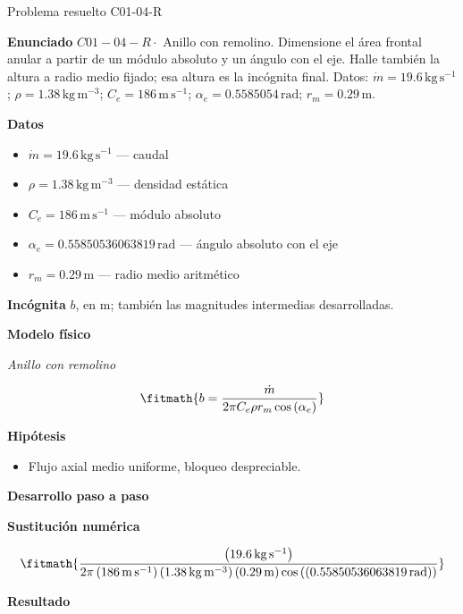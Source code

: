 \documentclass[10pt,openany]{book}
\begin{document}
\begin{studiumworked}{Problema resuelto C01-04-R}


\noindent\textbf{Enunciado}
\(C01-04-R \cdot\) Anillo con remolino. Dimensione el área frontal anular a partir de un módulo absoluto y un ángulo con el eje. Halle también la altura a radio medio fijado; esa altura es la incógnita final. Datos: \(\dot m=19.6\, \mathrm{kg}\,\mathrm{s}^{-1}\); \(\rho=1.38\, \mathrm{kg}\,\mathrm{m}^{-3}\); \(C_e=186\, \mathrm{m}\,\mathrm{s}^{-1}\); \(\alpha_e=0.5585054\, \mathrm{rad}\); \(r_m=0.29\, \mathrm{m}\).

\noindent\textbf{Datos}
\begin{itemize}
\item $\dot m = 19.6\,\mathrm{kg}\,\mathrm{s}^{-1}$ — caudal
\item $\rho = 1.38\,\mathrm{kg}\,\mathrm{m}^{-3}$ — densidad estática
\item $C_e = 186\,\mathrm{m}\,\mathrm{s}^{-1}$ — módulo absoluto
\item $\alpha_e = 0.55850536063819\,\mathrm{rad}$ — ángulo absoluto con el eje
\item $r_m = 0.29\,\mathrm{m}$ — radio medio aritmético
\end{itemize}

\noindent\textbf{Incógnita}
$b$, en $\mathrm{m}$; también las magnitudes intermedias desarrolladas.

\noindent\textbf{Modelo físico}

\noindent\textit{Anillo con remolino}

\[
\fitmath{b=\frac{\dot m}{2 \pi C_e \rho r_m \cos{\left(\alpha_e \right)}}}
\]

\noindent\textbf{Hipótesis}
\begin{itemize}
\item Flujo axial medio uniforme, bloqueo despreciable.
\end{itemize}

\noindent\textbf{Desarrollo paso a paso}



\noindent\textbf{Sustitución numérica}

\[
\fitmath{\frac{\left(19.6\,\mathrm{kg}\,\mathrm{s}^{-1}\right)}{2 \pi \left(186\,\mathrm{m}\,\mathrm{s}^{-1}\right) \left(1.38\,\mathrm{kg}\,\mathrm{m}^{-3}\right) \left(0.29\,\mathrm{m}\right) \cos{\left(\left(0.55850536063819\,\mathrm{rad}\right) \right)}}}
\]

\noindent\textbf{Resultado}


\end{studiumworked}
\end{document}
